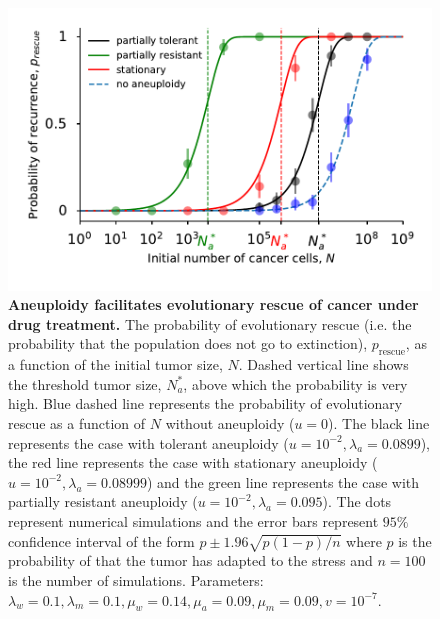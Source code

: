 \documentclass[12pt]{extarticle}
\newcommand{\presc}{p_\text{rescue}}
\begin{document}
\begin{figure}
\includegraphics[width=1\textwidth]{Figures/ProbvNPlot.pdf}
\caption{\textbf{Aneuploidy facilitates evolutionary rescue of cancer under drug treatment.}
The probability of evolutionary rescue (i.e. the probability that the population does not go to extinction), $\presc$, as a function of the initial tumor size, $N$. Dashed vertical line shows the threshold tumor size, $N_a^*$, above which the probability is very high. Blue dashed line represents the probability of evolutionary rescue as a function of $N$ without aneuploidy ($u=0$). The black line represents the case with tolerant aneuploidy ($u=10^{-2}, \lambda_a=0.0899$), the red line represents the case with stationary aneuploidy ($u=10^{-2}, \lambda_a=0.08999$) and the green line represents the case with partially resistant aneuploidy ($u=10^{-2}, \lambda_a=0.095$). The dots represent numerical simulations and the error bars represent $95\%$ confidence interval of the form $p\pm1.96\sqrt{p\left(1-p\right)/n}$ where $p$ is the probability of that the tumor has adapted to the stress and $n=100$ is the number of simulations. Parameters: $\lambda_w=0.1,\lambda_m=0.1,\mu_w=0.14,\mu_a=0.09,\mu_m=0.09, v=10^{-7}$.}
\label{rescue_prob}
\end{figure}
\end{document}
